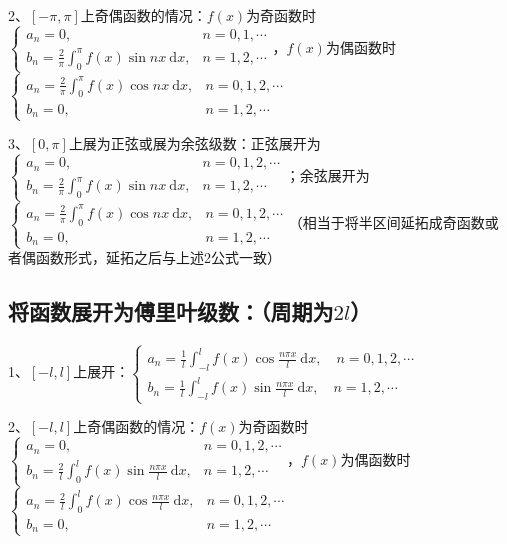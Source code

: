 2、$[-\pi, \pi]$上奇偶函数的情况：$f(x)$为奇函数时$\begin{cases}a_{n}=0, & n=0,1, \cdots \\ b_{n}=\frac{2}{\pi} \int_{0}^{\pi} f(x) \sin n x \mathrm{~d} x, & n=1,2, \cdots\end{cases}$，$f(x)$为偶函数时$\begin{cases}a_{n}=\frac{2}{\pi} \int_{0}^{\pi} f(x) \cos n x \mathrm{~d} x, & n=0,1,2, \cdots \\ b_{n}=0, & n=1,2, \cdots\end{cases}$

3、$[0, \pi]$上展为正弦或展为余弦级数：正弦展开为$\begin{cases}a_{n}=0, & n=0,1,2, \cdots \\ b_{n}=\frac{2}{\pi} \int_{0}^{\pi} f(x) \sin n x \mathrm{~d} x, & n=1,2, \cdots\end{cases}$；余弦展开为$\begin{cases}a_{n}=\frac{2}{\pi} \int_{0}^{\pi} f(x) \cos n x \mathrm{~d} x, & n=0,1,2, \cdots \\ b_{n}=0, & n=1,2, \cdots\end{cases}$（相当于将半区间延拓成奇函数或者偶函数形式，延拓之后与上述2公式一致）



\subsection{将函数展开为傅里叶级数：（周期为$2l$）}

1、$[-l, l]$上展开：$\left\{\begin{array}{l}

a_{n}=\frac{1}{l} \int_{-l}^{l} f(x) \cos \frac{n \pi x}{l} \mathrm{~d} x, \quad n=0,1,2, \cdots \\

b_{n}=\frac{1}{l} \int_{-l}^{l} f(x) \sin \frac{n \pi x}{l} \mathrm{~d} x, \quad n=1,2, \cdots

\end{array}\right.$

2、$[-l, l]$上奇偶函数的情况：$f(x)$为奇函数时$\begin{cases}a_{n}=0, & n=0,1,2, \cdots \\ b_{n}=\frac{2}{l} \int_{0}^{l} f(x) \sin \frac{n \pi x}{l} \mathrm{~d} x, & n=1,2, \cdots\end{cases}$，$f(x)$为偶函数时$\begin{cases}a_{n}=\frac{2}{l} \int_{0}^{l} f(x) \cos \frac{n \pi x}{l} \mathrm{~d} x, & n=0,1,2, \cdots \\ b_{n}=0, & n=1,2, \cdots\end{cases}$

